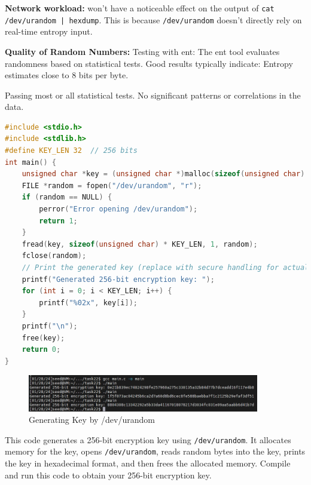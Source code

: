 \documentclass[a4paper]{article}
\begin{document}
\textbf{Network workload:} won't have a noticeable effect on the output of \verb!cat /dev/urandom | hexdump!. This is because \verb|/dev/urandom| doesn't directly rely on real-time entropy input.

\textbf{Quality of Random Numbers:}
Testing with ent: The ent tool evaluates randomness based on statistical tests. Good results typically indicate: Entropy estimates close to 8 bits per byte.

Passing most or all statistical tests.
No significant patterns or correlations in the data.

\begin{lstlisting}[caption={C Program Code for Generating Keys by /dev/urandom},label={lst:task22},language=C,breaklines=true]
#include <stdio.h>
#include <stdlib.h>
#define KEY_LEN 32  // 256 bits
int main() {
    unsigned char *key = (unsigned char *)malloc(sizeof(unsigned char) * KEY_LEN);
    FILE *random = fopen("/dev/urandom", "r");
    if (random == NULL) {
        perror("Error opening /dev/urandom");
        return 1;
    }
    fread(key, sizeof(unsigned char) * KEY_LEN, 1, random);
    fclose(random);
    // Print the generated key (replace with secure handling for actual use):
    printf("Generated 256-bit encryption key: ");
    for (int i = 0; i < KEY_LEN; i++) {
        printf("%02x", key[i]);
    }
    printf("\n");
    free(key);
    return 0;
}

\end{lstlisting} 

\begin{figure}[h]
    \centering
       \includegraphics[width=0.9\textwidth]{figures/task22/watch3.png}
    \caption{Generating Key by /dev/urandom}\label{fig:task22observation-3}
\end{figure}
This code generates a 256-bit encryption key using \verb|/dev/urandom|. It allocates memory for the key, opens \verb|/dev/urandom|, reads random bytes into the key, prints the key in hexadecimal format, and then frees the allocated memory. Compile and run this code to obtain your 256-bit encryption key.


%
\end{document}
